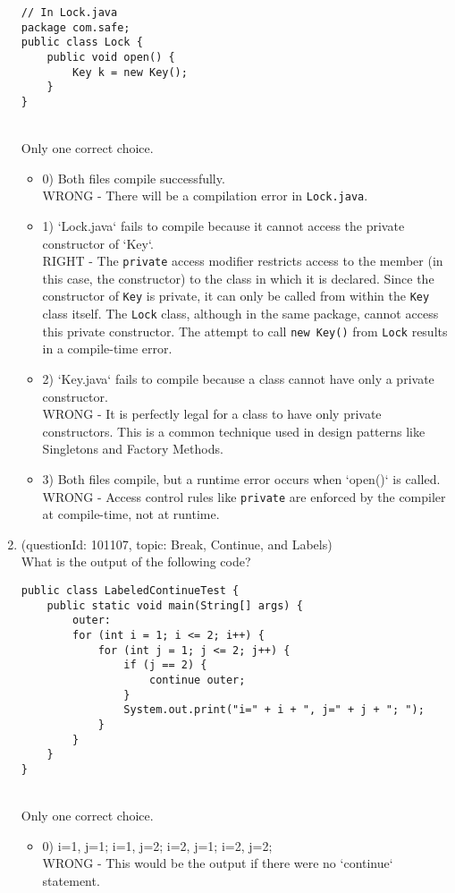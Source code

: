 \documentclass[12pt]{article}
\begin{document}
\begin{enumerate}[label=(\arabic*)]
\begin{verbatim}
// In Lock.java
package com.safe;
public class Lock {
    public void open() {
        Key k = new Key();
    }
}
\end{verbatim}
\\ \noindent Only one correct choice. 
\begin{itemize}
\item 0) Both files compile successfully.
 \\ 
WRONG - There will be a compilation error in \verb|Lock.java|.

\item 1) `Lock.java` fails to compile because it cannot access the private constructor of `Key`.
 \\ 
RIGHT - The \verb|private| access modifier restricts access to the member (in this case, the constructor) to the class in which it is declared. Since the constructor of \verb|Key| is private, it can only be called from within the \verb|Key| class itself. The \verb|Lock| class, although in the same package, cannot access this private constructor. The attempt to call \verb|new Key()| from \verb|Lock| results in a compile-time error.

\item 2) `Key.java` fails to compile because a class cannot have only a private constructor.
 \\ 
WRONG - It is perfectly legal for a class to have only private constructors. This is a common technique used in design patterns like Singletons and Factory Methods.

\item 3) Both files compile, but a runtime error occurs when `open()` is called.
 \\ 
WRONG - Access control rules like \verb|private| are enforced by the compiler at compile-time, not at runtime.

\end{itemize}
\item (questionId: 101107, topic: Break, Continue, and Labels) \\ 
What is the output of the following code?\n\begin{verbatim}
public class LabeledContinueTest {
    public static void main(String[] args) {
        outer:
        for (int i = 1; i <= 2; i++) {
            for (int j = 1; j <= 2; j++) {
                if (j == 2) {
                    continue outer;
                }
                System.out.print("i=" + i + ", j=" + j + "; ");
            }
        }
    }
}
\end{verbatim}
\\ \noindent Only one correct choice. 
\begin{itemize}
\item 0) i=1, j=1; i=1, j=2; i=2, j=1; i=2, j=2; 
 \\ 
WRONG - This would be the output if there were no `continue` statement.


\end{itemize}
\end{enumerate}
\end{document}
